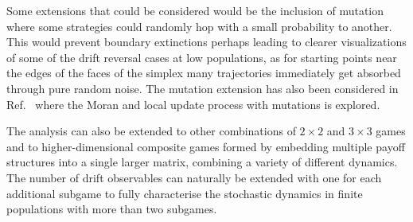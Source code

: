 \documentclass[%
 reprint,
 amsmath,amssymb,
 aps,
]{revtex4-2}
\begin{document}
Some extensions that could be considered would be the inclusion of mutation where some strategies could randomly hop with 
a small probability to another. This would prevent boundary extinctions perhaps 
leading to clearer visualizations of some of the drift reversal cases at low populations, 
as for starting points near the edges of the faces of the simplex many trajectories immediately 
get absorbed through pure random noise. The mutation extension has also been considered in
Ref.~\cite{general_moran_process} where the Moran and local update process with mutations is explored.

The analysis can also be extended to other combinations of $2 \times 2$ and 
$3 \times 3$ games and to higher-dimensional composite games
formed by embedding multiple payoff structures into a single larger matrix, combining a variety of
different dynamics. The number of drift observables can naturally be extended 
with one for each additional subgame
to fully characterise the stochastic dynamics in finite populations with more than two subgames.

\clearpage


\end{document}
